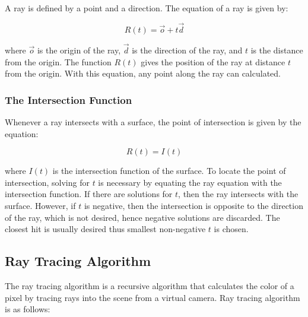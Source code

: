 \documentclass[12pt]{article}
\begin{document}
A ray is defined by a point and a direction. The equation of a ray is given by:

\begin{equation}
    R(t) = \vec{o} + t\vec{d}
\end{equation}

where $\vec{o}$ is the origin of the ray, $\vec{d}$ is the direction of the ray, and $t$ is the distance from the origin.
The function $R(t)$ gives the position of the ray at distance $t$ from the origin.
With this equation, any point along the ray can calculated.

\subsubsection{The Intersection Function}

Whenever a ray intersects with a surface, the point of intersection is given by the equation:

\begin{equation}
    R(t) = I(t)
\end{equation}

where $I(t)$ is the intersection function of the surface. To locate the point of intersection,
solving for $t$ is necessary by equating the ray equation with the intersection function. 
If there are solutions for $t$, then the ray intersects with the surface. However, 
if $t$ is negative, then the intersection is opposite to the direction of the ray, which is not desired,
hence negative solutions are discarded. The closest hit is usually desired thus smallest non-negative $t$ is chosen.

\subsection{Ray Tracing Algorithm}

The ray tracing algorithm is a recursive algorithm that calculates the color of a pixel by tracing rays into the scene from a virtual camera.
Ray tracing algorithm is as follows:
\end{document}
